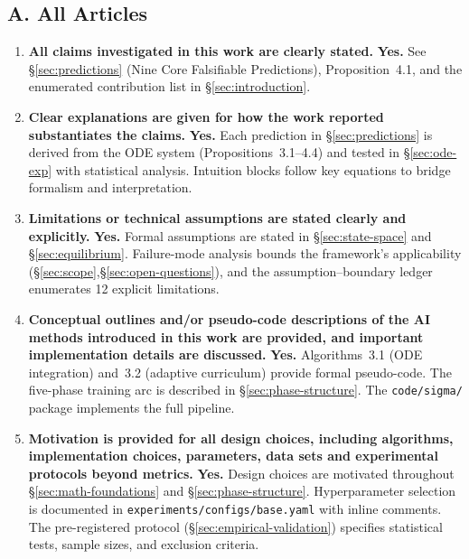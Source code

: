 \documentclass[10pt]{article}
\begin{document}
\subsection*{A. All Articles}
\begin{enumerate}
  \item \textbf{All claims investigated in this work are clearly stated.}
    \textbf{Yes.} See \S\ref{sec:predictions} (Nine Core Falsifiable Predictions),
    Proposition~4.1, and the enumerated contribution list in \S\ref{sec:introduction}.

  \item \textbf{Clear explanations are given for how the work reported substantiates the claims.}
    \textbf{Yes.} Each prediction in \S\ref{sec:predictions} is derived from the ODE
    system (Propositions~3.1--4.4) and tested in \S\ref{sec:ode-exp}
    with statistical analysis. Intuition blocks follow key equations to bridge
    formalism and interpretation.

  \item \textbf{Limitations or technical assumptions are stated clearly and explicitly.}
    \textbf{Yes.} Formal assumptions are stated in \S\ref{sec:state-space} and
    \S\ref{sec:equilibrium}. Failure-mode analysis bounds the framework's
    applicability (\S\ref{sec:scope},\S\ref{sec:open-questions}), and the
    assumption--boundary ledger enumerates 12 explicit limitations.

  \item \textbf{Conceptual outlines and/or pseudo-code descriptions of the AI methods
    introduced in this work are provided, and important implementation details are discussed.}
    \textbf{Yes.} Algorithms~3.1 (ODE integration) and~3.2 (adaptive curriculum)
    provide formal pseudo-code. The five-phase training arc is described in
    \S\ref{sec:phase-structure}. The \texttt{code/sigma/} package implements
    the full pipeline.

  \item \textbf{Motivation is provided for all design choices, including algorithms,
    implementation choices, parameters, data sets and experimental protocols beyond metrics.}
    \textbf{Yes.} Design choices are motivated throughout \S\ref{sec:math-foundations}
    and \S\ref{sec:phase-structure}. Hyperparameter selection is documented in
    \texttt{experiments/configs/base.yaml} with inline comments. The
    pre-registered protocol (\S\ref{sec:empirical-validation}) specifies
    statistical tests, sample sizes, and exclusion criteria.
\end{enumerate}
\end{document}
